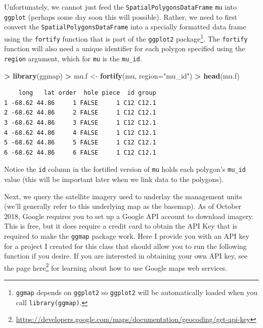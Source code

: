 \documentclass[]{krantz}
\makeatletter
\newenvironment{Shaded}{\begin{snugshade}}{\end{snugshade}}
\newcommand{\KeywordTok}[1]{\textcolor[rgb]{0.27,0.27,0.27}{\textbf{#1}}}
\newcommand{\DataTypeTok}[1]{\textcolor[rgb]{0.27,0.27,0.27}{#1}}
\newcommand{\StringTok}[1]{\textcolor[rgb]{0.5,0.5,0.5}{#1}}
\newcommand{\OperatorTok}[1]{\textcolor[rgb]{0.43,0.43,0.43}{\textbf{#1}}}
\newcommand{\NormalTok}[1]{#1}
\renewcommand{\href}[2]{#2\footnote{\url{#1}}}
\newenvironment{kframe}{%
\medskip{}
\setlength{\fboxsep}{.8em}
 \def\at@end@of@kframe{}%
 \ifinner\ifhmode%
  \def\at@end@of@kframe{\end{minipage}}%
  \begin{minipage}{\columnwidth}%
 \fi\fi%
 \def\FrameCommand##1{\hskip\@totalleftmargin \hskip-\fboxsep
 \colorbox{shadecolor}{##1}\hskip-\fboxsep
     \hskip-\linewidth \hskip-\@totalleftmargin \hskip\columnwidth}%
 \MakeFramed {\advance\hsize-\width
   \@totalleftmargin\z@ \linewidth\hsize
   \@setminipage}}%
 {\par\unskip\endMakeFramed%
 \at@end@of@kframe}
\renewenvironment{Shaded}{\begin{kframe}}{\end{kframe}}
\makeatother
\begin{document}
Unfortunately, we cannot just feed the \texttt{SpatialPolygonsDataFrame}
\texttt{mu} into \texttt{ggplot} (perhaps some day soon this will
possible). Rather, we need to first convert the
\texttt{SpatialPolygonsDataFrame} into a specially formatted data frame
using the \texttt{fortify} function that is part of the \texttt{ggplot2}
package\footnote{\texttt{ggmap} depends on \texttt{ggplot2} so
  \texttt{ggplot2} will be automatically loaded when you call
  \texttt{library(ggmap)}.}. The \texttt{fortify} function will also
need a unique identifier for each polygon specified using the
\texttt{region} argument, which for \texttt{mu} is the \texttt{mu\_id}.

\begin{Shaded}
\begin{Highlighting}[]
\OperatorTok{>}\StringTok{ }\KeywordTok{library}\NormalTok{(ggmap)}
\OperatorTok{>}\StringTok{ }\NormalTok{mu.f <-}\StringTok{ }\KeywordTok{fortify}\NormalTok{(mu, }\DataTypeTok{region=}\StringTok{"mu_id"}\NormalTok{)}
\OperatorTok{>}\StringTok{ }\KeywordTok{head}\NormalTok{(mu.f)}
\end{Highlighting}
\end{Shaded}

\begin{verbatim}
    long   lat order  hole piece  id group
1 -68.62 44.86     1 FALSE     1 C12 C12.1
2 -68.62 44.86     2 FALSE     1 C12 C12.1
3 -68.62 44.86     3 FALSE     1 C12 C12.1
4 -68.62 44.86     4 FALSE     1 C12 C12.1
5 -68.62 44.86     5 FALSE     1 C12 C12.1
6 -68.62 44.86     6 FALSE     1 C12 C12.1
\end{verbatim}

Notice the \texttt{id} column in the fortified version of \texttt{mu}
holds each polygon's \texttt{mu\_id} value (this will be important later
when we link data to the polygons).

Next, we query the satellite imagery used to underlay the management
units (we'll generally refer to this underlying map as the basemap). As
of October 2018, Google requires you to set up a Google API account to
download imagery. This is free, but it does require a credit card to
obtain the API Key that is required to make the \texttt{ggmap} package
work. Here I provide you with an API key for a project I created for
this class that should allow you to run the following function if you
desire. If you are interested in obtaining your own API key, see the
page
\href{https://developers.google.com/maps/documentation/geocoding/get-api-key}{here}
for learning about how to use Google maps web services.
\end{document}
